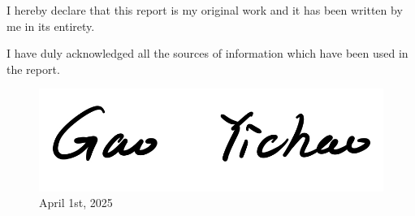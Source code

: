 \documentclass[12pt,twoside,letterpaper]{article}
\begin{document}
\vspace{2cm}

\begin{center}
    \begin{minipage}{0.8\textwidth}
        \centering
        \doublespacing
        \justifying
        \large
        \begin{center}
            I hereby declare that this report is my original work and it has been written by me in its entirety. 
            
            I have duly acknowledged all the sources of information which have been used in the report.
        \end{center}
    \end{minipage}
    \vspace{2cm}  

    \begin{figure}[H]
    \centering
    \begin{minipage}{0.5\textwidth}
        \centering
        \includegraphics[width=\linewidth]{figures/sign.jpeg}
        \vspace{0.5cm}
        \caption*{April 1st, 2025}
        \label{fig:minipage-example}
    \end{minipage}
\end{figure}

    
\end{center}
\newpage


\begin{center}
\tableofcontents
\end{center}
\newpage

\begin{center}
    \listoffigures
\end{center}


\newpage

\end{document}
